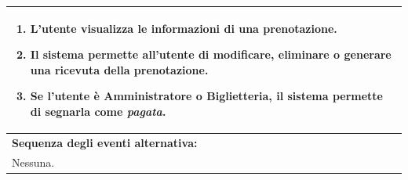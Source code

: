 \documentclass{article}
\begin{document}
\begin{table}[H]
\begin{tabular}{|p{\linewidth}|}
\begin{minipage}{\linewidth}
\begin{enumerate}
                                \item L'utente visualizza le informazioni di una prenotazione.
                                \item Il sistema permette all'utente di modificare, eliminare o generare una ricevuta della prenotazione.  %
                                \item Se l'utente è Amministratore o Biglietteria, il sistema permette di segnarla come \emph{pagata}.
                            \end{enumerate}
                        \end{minipage}
                        \vspace{0pt} \\
                        \hline
                        \textbf{Sequenza degli eventi alternativa:} \\
                        Nessuna. \\
                        \hline
                    \end{tabular}
                \end{table}
\end{document}
